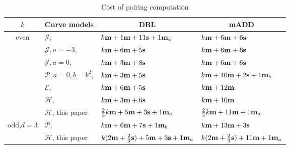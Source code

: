 \begin{table}[h]
\centering
\caption{Cost of pairing computation}

\begin{tabular}{ l | l | l | l}
\hline
\multicolumn{1}{c|}{$k$}
&\multicolumn{1}{c|}{Curve models}	&\multicolumn{1}{c|}{DBL}	&\multicolumn{1}{c}{mADD}	\\
\hline
\multicolumn{1}{c|}{\multirow{6}{*}{even}}
&$\mathcal{J}$, \cite{2008/IonicaJoux08} \cite{2009/fastertate}
				&$k\textbf{m} + 1\textbf{m} + 11\textbf{s} + 1\textbf{m}_{a}$	&$k\textbf{m} + 6\textbf{m} + 6\textbf{s}$	\\
&$\mathcal{J},a = -3$, \cite{2009/fastertate}
				&$k\textbf{m} + 6\textbf{m} + 5\textbf{s}$		&$k\textbf{m} + 6\textbf{m} + 6\textbf{s}$	\\
&$\mathcal{J},a = 0$, \cite{2009/fastertate}		
				&$k\textbf{m} + 3\textbf{m} + 8\textbf{s}$		&$k\textbf{m} + 6\textbf{m} + 6\textbf{s}$	\\
&$\mathcal{P},a = 0, b = b^2$, \cite{2009/craig}
				&$k\textbf{m} + 3\textbf{m} + 5\textbf{s}$		&$k\textbf{m} + 10\textbf{m} + 2\textbf{s} + 1\textbf{m}_{b}$	\\
&$\mathcal{E}$, \cite{2009/fastertate}			
				&$k\textbf{m} + 6\textbf{m} + 5\textbf{s}$		&$k\textbf{m} + 12\textbf{m}$	\\
&$\mathcal{H}$, \cite{2010/Gu}	&$k\textbf{m} + 3\textbf{m} + 6\textbf{s}$		&$k\textbf{m} + 10\textbf{m}$	\\
&$\mathcal{H}$, this paper
				&$\frac{2}{3}k\textbf{m} + 5\textbf{m} + 3\textbf{s} + 1\textbf{m}_a$
									&$\frac{2}{3}k\textbf{m} + 11\textbf{m} + 1\textbf{m}_a$	\\
\hline
\multicolumn{1}{c|}{\multirow{2}{*}{odd,$d{=}3$}}
&$\mathcal{P}$, \cite{2010/CLN}	&$k\textbf{m} + 6\textbf{m} + 7\textbf{s} + 1\textbf{m}_b$	&$k\textbf{m} + 13\textbf{m} + 3\textbf{s}$	\\
&$\mathcal{H}$, this paper
				&$k(2\textbf{m} + \frac{2}{3}\textbf{s}) + 5\textbf{m} + 3\textbf{s} + 1\textbf{m}_a$
									&$k(2\textbf{m} + \frac{2}{3}\textbf{s}) + 11\textbf{m} + 1\textbf{m}_a$	\\
\hline
\end{tabular}
\label{tbl-cmp}


\end{table}


